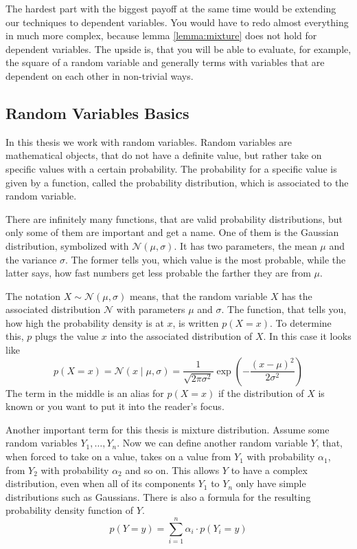 \documentclass[11pt,a4paper]{book}
\begin{document}
The hardest part with the biggest payoff at the same time would be extending our
techniques to dependent variables. You would have to redo almost everything in
much more complex, because lemma \ref{lemma:mixture} does not hold for dependent
variables. The upside is, that you will be able to evaluate, for example, the
square of a random variable and generally terms with variables that are
dependent on each other in non-trivial ways.

\begin{appendices}
  \chapter{Random Variables Basics}
  \label{ch:basics}

  In this thesis we work with random variables. Random variables are
  mathematical objects, that do not have a definite value, but rather take on
  specific values with a certain probability. The probability for a specific
  value is given by a function, called the probability distribution, which is
  associated to the random variable.

  There are infinitely many functions, that are valid probability distributions,
  but only some of them are important and get a name. One of them is the
  Gaussian distribution, symbolized with $\mathcal{N}(\mu, \sigma)$. It has two
  parameters, the mean $\mu$ and the variance $\sigma$. The former tells you,
  which value is the most probable, while the latter says, how fast numbers get
  less probable the farther they are from $\mu$.

  The notation $X \sim \mathcal{N}(\mu, \sigma)$ means, that the random variable
  $X$ has the associated distribution $\mathcal{N}$ with parameters $\mu$ and
  $\sigma$. The function, that tells you, how high the probability density is at
  $x$, is written $p(X = x)$. To determine this, $p$ plugs the value $x$ into
  the associated distribution of $X$. In this case it looks like
  \begin{equation*}
    p(X = x) = \mathcal{N}\left( x \mid \mu, \sigma \right) = \frac{1}{\sqrt{2 \pi \sigma^{2}}} \exp \left( - \frac{(x - \mu)^{2}}{2\sigma^{2}} \right)
  \end{equation*}
  The term in the middle is an alias for $p(X = x)$ if the distribution of $X$
  is known or you want to put it into the reader's focus.

  Another important term for this thesis is mixture distribution. Assume some
  random variables $Y_{1}, \dots, Y_{n}$. Now we can define another random
  variable $Y$, that, when forced to take on a value, takes on a value from
  $Y_{1}$ with probability $\alpha_{1}$, from $Y_{2}$ with probability
  $\alpha_{2}$ and so on. This allows $Y$ to have a complex distribution, even
  when all of its components $Y_{1}$ to $Y_{n}$ only have simple distributions
  such as Gaussians. There is also a formula for the resulting probability
  density function of $Y$.
  \begin{equation*}
    p(Y = y) = \sum_{i = 1}^{n} \alpha_{i} \cdot p(Y_{i} = y)
  \end{equation*}


\end{appendices}
\end{document}
